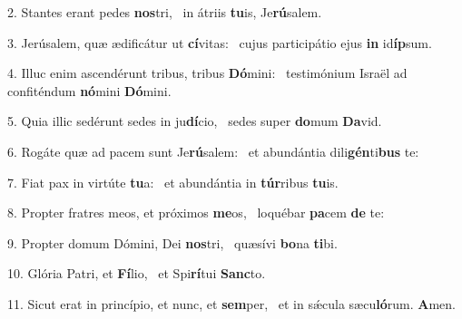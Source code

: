 2. Stantes erant pedes \textbf{nos}tri, \ast\  in átriis \textbf{tu}is, Je\textbf{rú}salem.\

3. Jerúsalem, quæ ædificátur ut \textbf{cí}vitas: \ast\  cujus participátio ejus \textbf{in} id\textbf{íp}sum.\

4. Illuc enim ascendérunt tribus, tribus \textbf{Dó}mini: \ast\  testimónium Israël ad confiténdum \textbf{nó}mini \textbf{Dó}mini.\

5. Quia illic sedérunt sedes in ju\textbf{dí}cio, \ast\  sedes super \textbf{do}mum \textbf{Da}vid.\

6. Rogáte quæ ad pacem sunt Je\textbf{rú}salem: \ast\  et abundántia dili\textbf{gén}ti\textbf{bus} te:\

7. Fiat pax in virtúte \textbf{tu}a: \ast\  et abundántia in \textbf{túr}ribus \textbf{tu}is.\

8. Propter fratres meos, et próximos \textbf{me}os, \ast\  loquébar \textbf{pa}cem \textbf{de} te:\

9. Propter domum Dómini, Dei \textbf{nos}tri, \ast\  quæsívi \textbf{bo}na \textbf{ti}bi.\

10. Glória Patri, et \textbf{Fí}lio, \ast\  et Spi\textbf{rí}tui \textbf{Sanc}to.\

11. Sicut erat in princípio, et nunc, et \textbf{sem}per, \ast\  et in sǽcula sæcu\textbf{ló}rum. \textbf{A}men.\

